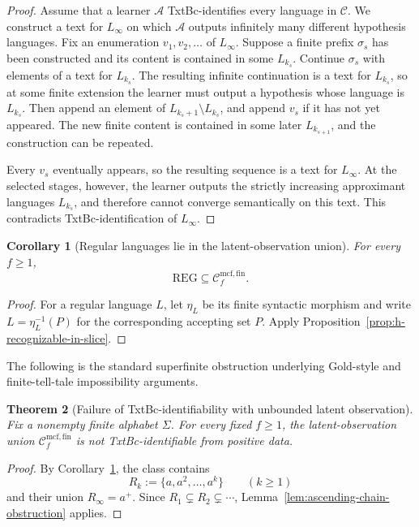 \documentclass[11pt,a4paper]{article}
\numberwithin{equation}{section}
\theoremstyle{plain}
\newtheorem{theorem}{Theorem}[section]
\newtheorem{corollary}[theorem]{Corollary}
\theoremstyle{definition}
\theoremstyle{remark}
\newcommand{\Callobs}[1]{\mathcal{C}^{\mathrm{mcf},\mathrm{fin}}_{#1}}
\begin{document}
\begin{proof}
Assume that a learner \(\mathcal A\) TxtBc-identifies every language in
\(\mathcal C\).  We construct a text for \(L_\infty\) on which
\(\mathcal A\) outputs infinitely many different hypothesis languages.
Fix an enumeration \(v_1,v_2,\ldots\) of \(L_\infty\).  Suppose a finite prefix
\(\sigma_s\) has been constructed and its content is contained in some
\(L_{k_s}\).  Continue \(\sigma_s\) with elements of a text for \(L_{k_s}\).
The resulting infinite continuation is a text for \(L_{k_s}\), so at some
finite extension the learner must output a hypothesis whose language is
\(L_{k_s}\).  Then append an element of
\(L_{k_s+1}\setminus L_{k_s}\), and append \(v_s\) if it has not yet appeared.
The new finite content is contained in some later \(L_{k_{s+1}}\), and the
construction can be repeated.

Every \(v_s\) eventually appears, so the resulting sequence is a text for
\(L_\infty\).  At the selected stages, however, the learner outputs the
strictly increasing approximant languages \(L_{k_s}\), and therefore cannot
converge semantically on this text.  This contradicts TxtBc-identification of
\(L_\infty\).
\end{proof}

\begin{corollary}[Regular languages lie in the latent-observation union]
\label{cor:regular-in-latent-union}
For every \(f\ge1\),
\[
  \mathrm{REG}\subseteq\Callobs{f}.
\]
\end{corollary}

\begin{proof}
For a regular language $L$, let $\eta_L$ be its finite syntactic morphism and
write $L=\eta_L^{-1}(P)$ for the corresponding accepting set $P$.  Apply
Proposition~\ref{prop:h-recognizable-in-slice}.
\end{proof}

The following is the standard superfinite obstruction underlying Gold-style
and finite-tell-tale impossibility arguments.

\begin{theorem}[Failure of TxtBc-identifiability with unbounded latent observation]
\label{thm:no-advice-nonidentifiability}
Fix a nonempty finite alphabet \(\Sigma\).  For every fixed \(f\ge1\),
the latent-observation union \(\Callobs{f}\) is not TxtBc-identifiable from
positive data.
\end{theorem}

\begin{proof}
By Corollary~\ref{cor:regular-in-latent-union}, the class contains
\[
  R_k:=\{a,a^2,\ldots,a^k\}\qquad(k\ge1)
\]
and their union \(R_\infty=a^+\).  Since
\(R_1\subsetneq R_2\subsetneq\cdots\),
Lemma~\ref{lem:ascending-chain-obstruction} applies.
\end{proof}
\end{document}
